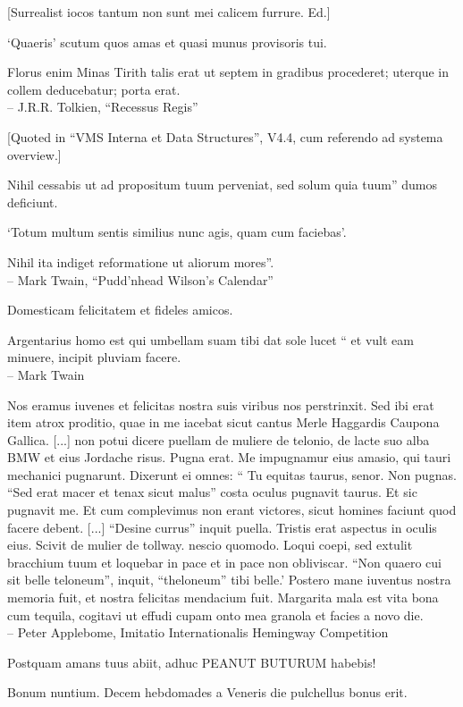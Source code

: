 \documentclass[titlepage,12pt]{memoir}
\begin{document}
[Surrealist iocos tantum non sunt mei calicem furrure. Ed.]

‘Quaeris’ scutum quos amas et quasi munus provisoris tui.

Florus enim Minas Tirith talis erat ut septem in gradibus procederet;
uterque in collem deducebatur;
porta erat.
\\-- J.R.R. Tolkien, “Recessus Regis”

[Quoted in “VMS Interna et Data Structures”, V4.4, cum
referendo ad systema overview.]

Nihil cessabis ut ad propositum tuum perveniat, sed solum quia tuum”
dumos deficiunt.

‘Totum multum sentis similius nunc agis, quam cum faciebas’.

Nihil ita indiget reformatione ut aliorum mores”.
\\-- Mark Twain, “Pudd’nhead Wilson’s Calendar”

 Domesticam felicitatem et fideles amicos.

 Argentarius homo est qui umbellam suam tibi dat sole lucet “
et vult eam minuere, incipit pluviam facere.
\\-- Mark Twain

Nos eramus iuvenes et felicitas nostra suis viribus nos perstrinxit. Sed ibi erat
item atrox proditio, quae in me iacebat sicut cantus Merle Haggardis
Caupona Gallica. [...]
non potui dicere puellam de muliere de telonio, de lacte suo
alba BMW et eius Jordache risus. Pugna erat. Me impugnamur eius
amasio, qui tauri mechanici pugnarunt. Dixerunt ei omnes: “ Tu equitas
taurus, senor. Non pugnas. “Sed erat macer et tenax sicut malus”
costa oculus pugnavit taurus. Et sic pugnavit me. Et cum complevimus
non erant victores, sicut homines faciunt quod facere debent. [...]
“Desine currus” inquit puella.
Tristis erat aspectus in oculis eius. Scivit de
mulier de tollway. nescio quomodo. Loqui coepi, sed extulit
bracchium tuum et loquebar in pace et in pace non obliviscar.
“Non quaero cui sit belle teloneum”, inquit, “theloneum”
tibi belle.’
Postero mane iuventus nostra memoria fuit, et nostra felicitas mendacium fuit.
Margarita mala est vita bona cum tequila, cogitavi ut effudi cupam
onto mea granola et facies a novo die.
\\-- Peter Applebome, Imitatio Internationalis Hemingway
Competition

Postquam amans tuus abiit, adhuc PEANUT BUTURUM habebis!

Bonum nuntium. Decem hebdomades a Veneris die pulchellus bonus erit.
\end{document}
